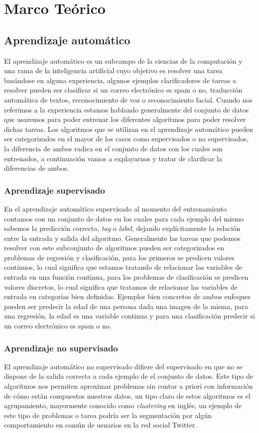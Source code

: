 \chapter{Marco Teórico} \label{chapter:chapter2}

\section{Aprendizaje automático}
El aprendizaje automático es un subcampo de la ciencias de la computación y una rama de la inteligencia artificial cuyo objetivo es resolver una tarea basándose en alguna experiencia, algunos ejemplos clarificadores de tareas a resolver pueden ser clasificar si un correo electrónico es spam o no, traducción automática de textos, reconocimiento de voz o reconocimiento facial. Cuando nos referimos a la experiencia estamos hablando generalmente del conjunto de datos que usaremos para poder entrenar los diferentes algoritmos para poder resolver dichas tareas. Los algoritmos que se utilizan en el aprendizaje automático pueden ser categorizados en el mayor de los casos como supervisados o no supervisados, la diferencia de ambos radica en el conjunto de datos con los cuales son entrenados, a continuación vamos a explayarnos y tratar de clarificar la diferencias de ambos.

\subsection{Aprendizaje supervisado}
En el aprendizaje automático supervisado al momento del entrenamiento contamos con un conjunto de datos en los cuales para cada ejemplo del mismo sabemos la predicción correcta, \textit{tag} o \textit{label}, dejando explícitamente la relación entre la entrada y salida del algoritmo. Generalmente las tareas que podemos resolver con este subconjunto de algoritmos pueden ser categorizados en problemas de regresión y clasificación, para los primeros se predicen valores continuos, lo cual significa que estamos tratando de relacionar las variables de entrada en una función continua, para los problemas de clasificación se predicen valores discretos, lo cual significa que tratamos de relacionar las variables de entrada en categorías bien definidas. Ejemplos bien concretos de ambos enfoques pueden ser predecir la edad de una persona dada una imagen de la misma, para una regresión, la edad es una variable continua y para una clasificación predecir si un correo electrónico es spam o no.

\subsection{Aprendizaje no supervisado}
El aprendizaje automático no supervisado difiere del supervisado en que no se dispone de la salida correcta a cada ejemplo de el conjunto de datos. Este tipo de algoritmos nos permiten aproximar problemas sin contar a priori con información de cómo están compuestos nuestros datos, un tipo claro de estos algoritmos es el agrupamiento, mayormente conocido como \textit{clustering} en inglés, un ejemplo de este tipo de problemas o tarea podría ser la segmentación por algún comportamiento en común de usuarios en la red social Twitter.


